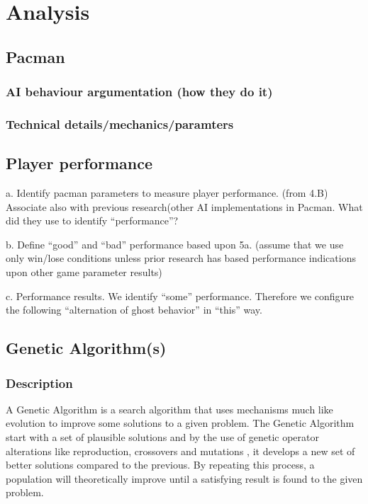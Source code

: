 \section{Analysis} \label{sec:analysis}




\subsection{Pacman}
\subsubsection{AI behaviour argumentation (how they do it)}
\subsubsection{Technical details/mechanics/paramters}

\subsection{Player performance}
a. Identify pacman parameters to measure player performance. (from 4.B) Associate also with  previous research(other AI implementations in Pacman. What did they use to  identify “performance”?


b. Define “good” and “bad” performance based upon 5a. (assume that we use only win/lose conditions unless prior research has based performance indications upon other game parameter results)

c. Performance results. We identify “some” performance. Therefore we configure the following “alternation of ghost behavior” in “this” way.

\subsection{Genetic Algorithm(s)}

\subsubsection{Description}
A Genetic Algorithm is a search algorithm that uses mechanisms much like evolution to improve some solutions to a given problem. The Genetic Algorithm start with a set of plausible solutions and by the use of genetic operator alterations like reproduction, crossovers and mutations \cite{Baltzer2014}, it develops a new set of better solutions compared to the previous. By repeating this process, a population will theoretically improve until a satisfying result is found to the given problem. \cite{BCS2013}




